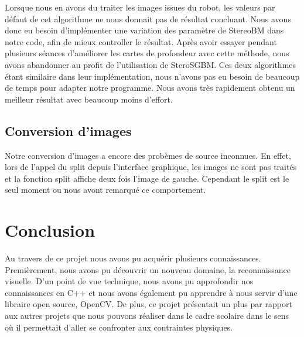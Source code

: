 \documentclass[a4paper]{article}
\begin{document}
Lorsque nous en avons du traiter les images issues du robot, les valeurs par défaut de cet algorithme ne nous donnait pas de résultat concluant. Nous avons donc eu besoin d'implémenter une variation des paramètre de StereoBM dans notre code, afin de mieux controller le résultat. Après avoir essayer pendant plusieurs séances d'améliorer les cartes de profondeur avec cette méthode, nous avons abandonner au profit de l'utilisation de SteroSGBM. Ces deux algorithmes étant similaire dans leur implémentation, nous n'avons pas eu besoin de beaucoup de temps pour adapter notre programme. Nous avons très rapidement obtenu un meilleur résultat avec beaucoup moins d'effort.

\subsection*{Conversion d'images}

Notre conversion d'images a encore des probèmes de source inconnues. En effet, lors de l'appel du split depuis l'interface graphique, les images ne sont pas traités et la fonction split affiche deux fois l'image de gauche. Cependant le split est le seul moment ou nous avont remarqué ce comportement.


\section{Conclusion}

Au travers de ce projet nous avons pu acquérir plusieurs connaissances. Premièrement,
nous avons pu découvrir un nouveau domaine, la reconnaissance visuelle. D'un point
de vue technique, nous avons pu approfondir nos connaissances en C++ et nous avons
également pu apprendre à nous servir d'une libraire open source, OpenCV.
De plus, ce projet présentait un plus par rapport aux autres projets que nous
pouvons réaliser dans le cadre scolaire dans le sens où il permettait d'aller
se confronter aux contraintes physiques.


\end{document}
